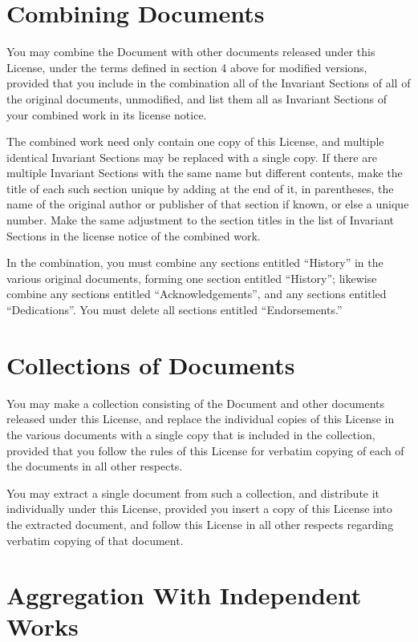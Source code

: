 \section{Combining Documents}

You may combine the Document with other documents released under this
License, under the terms defined in section 4 above for modified
versions, provided that you include in the combination all of the
Invariant Sections of all of the original documents, unmodified, and
list them all as Invariant Sections of your combined work in its
license notice.

The combined work need only contain one copy of this License, and
multiple identical Invariant Sections may be replaced with a single
copy.  If there are multiple Invariant Sections with the same name but
different contents, make the title of each such section unique by
adding at the end of it, in parentheses, the name of the original
author or publisher of that section if known, or else a unique number.
Make the same adjustment to the section titles in the list of
Invariant Sections in the license notice of the combined work.

In the combination, you must combine any sections entitled ``History''
in the various original documents, forming one section entitled
``History''; likewise combine any sections entitled ``Acknowledgements'',
and any sections entitled ``Dedications''.  You must delete all sections
entitled ``Endorsements.''


\section{Collections of Documents}

You may make a collection consisting of the Document and other documents
released under this License, and replace the individual copies of this
License in the various documents with a single copy that is included in
the collection, provided that you follow the rules of this License for
verbatim copying of each of the documents in all other respects.

You may extract a single document from such a collection, and distribute
it individually under this License, provided you insert a copy of this
License into the extracted document, and follow this License in all
other respects regarding verbatim copying of that document.



\section{Aggregation With Independent Works}

